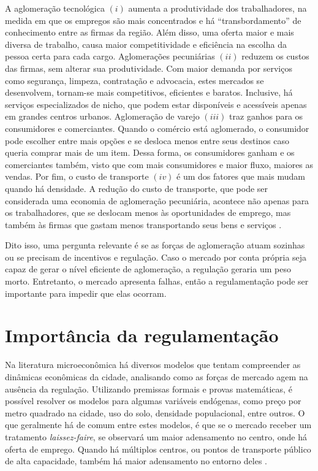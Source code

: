 A aglomeração tecnológica $(i)$ aumenta a produtividade dos trabalhadores, na medida em que os empregos são mais concentrados e há ``transbordamento'' de conhecimento entre as firmas da região. Além disso, uma oferta maior e mais diversa de trabalho, causa maior competitividade e eficiência na escolha da pessoa certa para cada cargo. Aglomerações pecuniárias $(ii)$ reduzem os custos das firmas, sem alterar sua produtividade. Com maior demanda por serviços como segurança, limpeza, contratação e advocacia, estes mercados se desenvolvem, tornam-se mais competitivos, eficientes e baratos. Inclusive, há serviços especializados de nicho, que podem estar disponíveis e acessíveis apenas em grandes centros urbanos. Aglomeração de varejo $(iii)$ traz ganhos para os consumidores e comerciantes. Quando o comércio está aglomerado, o consumidor pode escolher entre mais opções e se desloca menos entre seus destinos caso queria comprar mais de um item. Dessa forma, os consumidores ganham e os comerciantes também, visto que com mais consumidores e maior fluxo, maiores as vendas. Por fim, o custo de transporte $(iv)$ é um dos fatores que mais mudam quando há densidade. A redução do custo de transporte, que pode ser considerada uma economia de aglomeração pecuniária, acontece não apenas para os trabalhadores, que se deslocam menos às oportunidades de emprego, mas também às firmas que gastam menos transportando seus bens e serviços \cite{brueckner2011lectures}.

Dito isso, uma pergunta relevante é se as forças de aglomeração atuam sozinhas ou se precisam de incentivos e regulação. Caso o mercado por conta própria seja capaz de gerar o nível eficiente de aglomeração, a regulação geraria um peso morto. Entretanto, o mercado apresenta falhas, então a regulamentação pode ser importante para impedir que elas ocorram.

\section{Importância da regulamentação}%

Na literatura microeconômica há diversos modelos que tentam compreender as dinâmicas econômicas da cidade, analisando como as forças de mercado agem na ausência da regulação. Utilizando premissas formais e provas matemáticas, é possível resolver os modelos para algumas variáveis endógenas, como preço por metro quadrado na cidade, uso do solo, densidade populacional, entre outros. O que geralmente há de comum entre estes modelos, é que se o mercado receber um tratamento \textit{laissez-faire}, se observará um maior adensamento no centro, onde há oferta de emprego. Quando há múltiplos centros, ou pontos de transporte público de alta capacidade, também há maior adensamento no entorno deles \cite{papageorgiou2012essay, fujita1989urban,brueckner2011lectures}.


